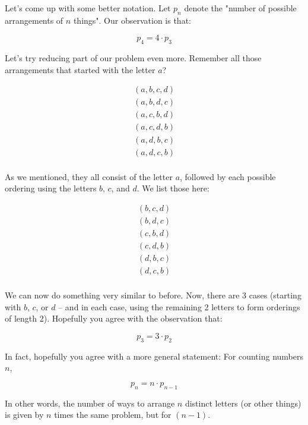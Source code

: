 Let's come up with some better notation. Let $p_n$ denote the "number of possible arrangements of $n$ things". Our observation is that:

\begin{equation*}
p_4 = 4 \cdot p_3
\end{equation*}


Let's try reducing part of our problem even more. Remember all those arrangements that started with the letter $a$?

\begin{gather*}
(a, b, c, d) \\
(a, b, d, c) \\
(a, c, b, d) \\
(a, c, d, b) \\
(a, d, b, c) \\
(a, d, c, b) \\
\end{gather*}

As we mentioned, they all consist of the letter $a$, followed by each possible ordering using the letters $b$, $c$, and $d$. We list those here:

\begin{gather*}
(b, c, d) \\
(b, d, c) \\
(c, b, d) \\
(c, d, b) \\
(d, b, c) \\
(d, c, b) \\
\end{gather*}

We can now do something very similar to before. Now, there are 3 cases (starting with $b$, $c$, or $d$ -- and in each case, using the remaining 2 letters to form orderings of length 2). Hopefully you agree with the observation that:

\begin{equation*}
p_3 = 3 \cdot p_2
\end{equation*}


In fact, hopefully you agree with a more general statement: For counting numbers $n$,

\begin{equation}
\label{eq:nperms-rec}
p_n = n \cdot p_{n-1}
\end{equation}

In other words, the number of ways to arrange $n$ distinct letters (or other things) is given by $n$ times the same problem, but for $(n-1)$. 

